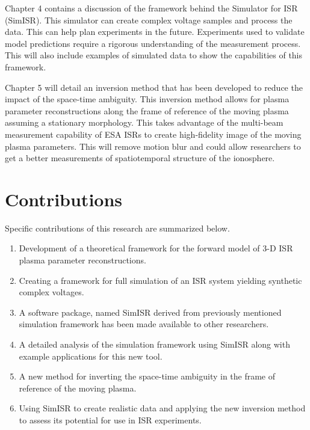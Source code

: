 Chapter 4 contains a discussion of the framework behind the Simulator for ISR (SimISR). This simulator can create complex voltage samples and process the data. This can help plan experiments in the future. Experiments used to validate model predictions require a rigorous understanding of the measurement process. This will also include examples of simulated data to show the capabilities of this framework.

Chapter 5 will detail an inversion method that has been developed to reduce the impact of the space-time ambiguity. This inversion method allows for plasma parameter reconstructions along the frame of reference of the moving plasma assuming a stationary morphology. This takes advantage of the multi-beam measurement capability of ESA ISRs to create high-fidelity image of the moving plasma parameters. This will remove motion blur and could allow researchers to get a better measurements of spatiotemporal structure of the ionosphere. 

\section{Contributions}
Specific contributions of this research are summarized below.

\begin{enumerate}
\item Development of a theoretical framework for the forward model of 3-D ISR plasma parameter reconstructions.
\item Creating a framework for full simulation of an ISR system yielding synthetic complex voltages.
\item A software package, named SimISR derived from previously mentioned simulation framework has been made available to other researchers.
\item A detailed analysis of the simulation framework using SimISR along with example applications for this new tool.
\item A new method for inverting the space-time ambiguity in the frame of reference of the moving plasma.
\item Using SimISR to create realistic data and applying the new inversion method to assess its potential for use in ISR experiments.
\end{enumerate}